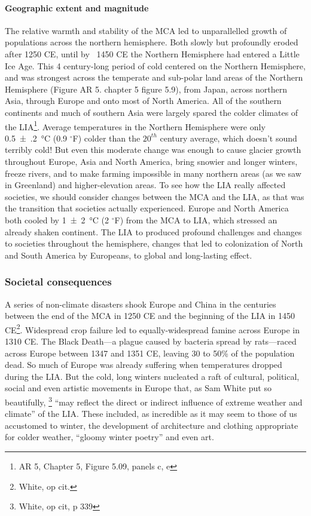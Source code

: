 \documentclass[amstex,12pt]{book}
\begin{document}
\paragraph{Geographic extent and magnitude}
The relative warmth and stability of the MCA led to unparallelled growth of populations across the northern hemisphere. Both slowly but profoundly eroded after 1250 CE, until by ~1450 CE the Northern Hemisphere had entered a Little Ice Age. This 4 century-long period of cold centered on the Northern Hemisphere, and was strongest across the temperate and sub-polar land areas of the Northern Hemisphere (Figure AR 5. chapter 5 figure 5.9), from Japan, across northern Asia, through Europe and onto most of North America. All of the southern continents and much of southern Asia were largely spared the colder climates of the LIA\footnote{AR 5, Chapter 5, Figure 5.09, panels c, e}. Average temperatures in the Northern Hemisphere were only \SI{0.5(2)}{\celsius} (0.9 $^\circ$F) colder than the $20^{th}$ century average, which doesn't sound terribly cold! But even this moderate change was enough to cause glacier growth throughout Europe, Asia and North America, bring snowier and longer winters, freeze rivers, and to make farming impossible in many northern areas (as we saw in Greenland) and higher-elevation areas. To see how the LIA really affected societies, we should consider changes between the MCA and the LIA, as that was the transition that societies actually experienced. Europe and North America both cooled by \SI{1(2)}{\celsius} (2 $^\circ$F) from the MCA to LIA, which stressed an already shaken continent. The LIA to produced profound challenges and changes to societies throughout the hemisphere, changes that led to colonization of North and South America by Europeans, to global and long-lasting effect.

\subsubsection{Societal consequences}
A series of non-climate disasters shook Europe and China in the centuries between the end of the MCA in 1250 CE and the beginning of the LIA in 1450 CE\footnote{White, op cit.}. Widespread crop failure led to equally-widespread famine across Europe in 1310 CE. The Black Death---a plague caused by bacteria spread by rats---raced across Europe between 1347 and 1351 CE, leaving 30 to 50\% of the population dead. So much of Europe was already suffering when temperatures dropped during the LIA. But the cold, long winters nucleated a raft of cultural, political, social and even artistic movements in Europe that, as Sam White put so beautifully, \footnote{White, op cit, p 339} ``may reflect the direct or indirect influence of extreme weather and climate'' of the LIA. These included, as incredible as it may seem to those of us accustomed to winter, the development of architecture and clothing appropriate for colder weather, ``gloomy winter poetry'' and even art. \\
\end{document}
